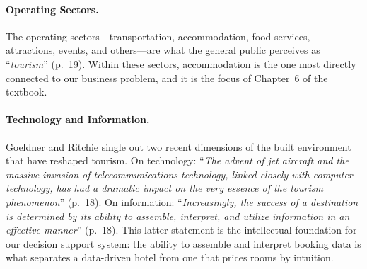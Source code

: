\paragraph{Operating Sectors.}
The operating sectors---transportation, accommodation, food services, attractions, events, and others---are what the general public perceives as ``\emph{tourism}'' (p.~19). Within these sectors, accommodation is the one most directly connected to our business problem, and it is the focus of Chapter~6 of the textbook.

\paragraph{Technology and Information.}
Goeldner and Ritchie single out two recent dimensions of the built environment that have reshaped tourism. On technology: ``\emph{The advent of jet aircraft and the massive invasion of telecommunications technology, linked closely with computer technology, has had a dramatic impact on the very essence of the tourism phenomenon}'' (p.~18). On information: ``\emph{Increasingly, the success of a destination is determined by its ability to assemble, interpret, and utilize information in an effective manner}'' (p.~18). This latter statement is the intellectual foundation for our decision support system: the ability to assemble and interpret booking data is what separates a data-driven hotel from one that prices rooms by intuition.
